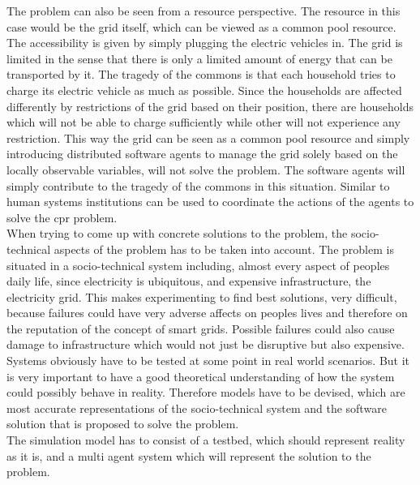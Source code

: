 \documentclass[a4paper]{article}
\begin{document}
The problem can also be seen from a resource perspective. The resource in this case would be the grid itself, which can be viewed as a 
common pool resource.
The accessibility is given by simply plugging the electric vehicles in. 
The grid is limited in the sense that there is only a limited amount of energy that can be transported by it. The tragedy
of the commons is that each household tries to charge its electric vehicle as much as possible. Since the households are 
affected differently by restrictions of the grid based on their position, there are households which will not be able to 
charge sufficiently while other will not experience any restriction. 
This way the grid can be seen as a common pool resource and simply introducing distributed software agents to manage the grid solely based 
on the locally observable variables, will not solve the problem. The software agents will simply contribute to the 
tragedy of the commons in this situation. Similar to human systems institutions can be used to coordinate the actions of the agents to 
solve the cpr problem. \\
 When trying to come up with concrete solutions to the problem, the socio-technical aspects of the problem has to be taken into account.
The problem is situated in a socio-technical system including, almost every aspect of peoples daily life, 
since electricity is ubiquitous, and expensive infrastructure, the electricity grid. This makes experimenting to find 
best solutions, very difficult, because failures could have very adverse affects on peoples lives and therefore on the 
reputation of the concept of smart grids. Possible failures could also cause damage to infrastructure which would not just
be disruptive but also expensive. Systems obviously have to be tested at some point in real world scenarios. But it is 
very important to have a good theoretical understanding of how the system could possibly behave in reality. Therefore 
models have to be devised, which are most accurate representations of the socio-technical system and the 
software solution that is proposed to solve the problem. \\
The simulation model has to consist of a testbed, which should represent reality as it is, and a multi agent system which will 
represent the solution to the problem. 
\end{document}
